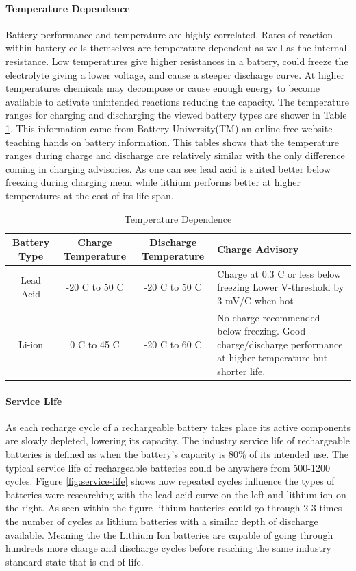 \paragraph{Temperature Dependence}
Battery performance and temperature are highly correlated. Rates of reaction within battery cells themselves are temperature dependent as well as the internal resistance. Low temperatures give higher resistances in a battery, could freeze the electrolyte giving a lower voltage, and cause a steeper discharge curve. At higher temperatures chemicals may decompose or cause enough energy to become available to activate unintended reactions reducing the capacity. The temperature ranges for charging and discharging the viewed battery types are shower in Table \ref{tab:temperature-dependence}. This information came from Battery University(TM) an online free website teaching hands on battery information. This tables shows that the temperature ranges during charge and discharge are relatively similar with the only difference coming in charging advisories. As one can see lead acid is suited better below freezing during charging mean while lithium performs better at higher temperatures at the cost of its life span. 
\begin{table}
\centering\scriptsize
\caption{Temperature Dependence}
\begin{tabularx}{\linewidth}{|c|c|c|X|}
\hline
Battery Type & Charge Temperature & Discharge Temperature & Charge Advisory \\ 
\hline\hline

Lead Acid     & -20 C to 50 C   & -20 C to 50 C & Charge at 0.3 C or less below freezing Lower V-threshold by 3 mV/C when hot  \\\hline
Li-ion        & 0 C to 45 C     & -20 C to 60 C & No charge recommended below freezing. Good charge/discharge performance at higher temperature but shorter life.  \\\hline

\end{tabularx}
\label{tab:temperature-dependence}
\end{table}
\paragraph{Service Life}
As each recharge cycle of a rechargeable battery takes place its active components are slowly depleted, lowering its capacity. The industry service life of rechargeable batteries is defined as when the battery's capacity is 80\% of its intended use. The typical service life of rechargeable batteries could be anywhere from 500-1200 cycles. Figure \ref{fig:service-life} shows how repeated cycles influence the types of batteries were researching with the lead acid curve on the left and lithium ion on the right. As seen within the figure lithium batteries could go through 2-3 times the number of cycles as lithium batteries with a similar depth of discharge available. Meaning the the Lithium Ion batteries are capable of going through hundreds more charge and discharge cycles before reaching the same industry standard state that is end of life.

